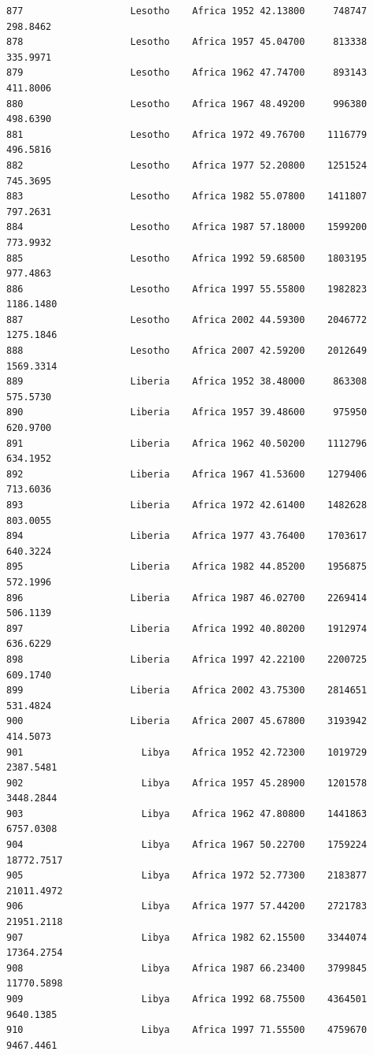 \documentclass[
  letterpaper,
  DIV=11,
  numbers=noendperiod]{scrreprt}
\begin{document}
\begin{verbatim}
877                   Lesotho    Africa 1952 42.13800     748747    298.8462
878                   Lesotho    Africa 1957 45.04700     813338    335.9971
879                   Lesotho    Africa 1962 47.74700     893143    411.8006
880                   Lesotho    Africa 1967 48.49200     996380    498.6390
881                   Lesotho    Africa 1972 49.76700    1116779    496.5816
882                   Lesotho    Africa 1977 52.20800    1251524    745.3695
883                   Lesotho    Africa 1982 55.07800    1411807    797.2631
884                   Lesotho    Africa 1987 57.18000    1599200    773.9932
885                   Lesotho    Africa 1992 59.68500    1803195    977.4863
886                   Lesotho    Africa 1997 55.55800    1982823   1186.1480
887                   Lesotho    Africa 2002 44.59300    2046772   1275.1846
888                   Lesotho    Africa 2007 42.59200    2012649   1569.3314
889                   Liberia    Africa 1952 38.48000     863308    575.5730
890                   Liberia    Africa 1957 39.48600     975950    620.9700
891                   Liberia    Africa 1962 40.50200    1112796    634.1952
892                   Liberia    Africa 1967 41.53600    1279406    713.6036
893                   Liberia    Africa 1972 42.61400    1482628    803.0055
894                   Liberia    Africa 1977 43.76400    1703617    640.3224
895                   Liberia    Africa 1982 44.85200    1956875    572.1996
896                   Liberia    Africa 1987 46.02700    2269414    506.1139
897                   Liberia    Africa 1992 40.80200    1912974    636.6229
898                   Liberia    Africa 1997 42.22100    2200725    609.1740
899                   Liberia    Africa 2002 43.75300    2814651    531.4824
900                   Liberia    Africa 2007 45.67800    3193942    414.5073
901                     Libya    Africa 1952 42.72300    1019729   2387.5481
902                     Libya    Africa 1957 45.28900    1201578   3448.2844
903                     Libya    Africa 1962 47.80800    1441863   6757.0308
904                     Libya    Africa 1967 50.22700    1759224  18772.7517
905                     Libya    Africa 1972 52.77300    2183877  21011.4972
906                     Libya    Africa 1977 57.44200    2721783  21951.2118
907                     Libya    Africa 1982 62.15500    3344074  17364.2754
908                     Libya    Africa 1987 66.23400    3799845  11770.5898
909                     Libya    Africa 1992 68.75500    4364501   9640.1385
910                     Libya    Africa 1997 71.55500    4759670   9467.4461

\end{verbatim}
\end{document}
